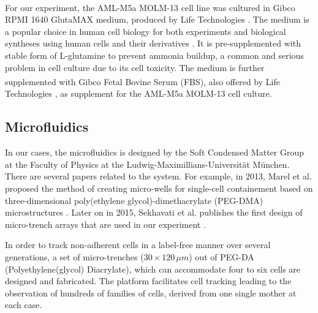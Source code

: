 \documentclass[pdftex,12pt,a4paper]{report}
\begin{document}
For our experiment, the AML-M5a MOLM-13 cell line was cultured in Gibco\textsuperscript{\textregistered} RPMI 1640 GlutaMAX medium, produced by Life Technologies \cite{gibcocellculture2017}. The medium is a popular choice in human cell biology for both experiments and biological syntheses using human cells and their derivatives \cite{blight2000efficient, shimizu2002fabrication}. It is pre-supplemented with stable form of L-glutamine to prevent ammonia buildup, a common and serious problem in cell culture due to its cell toxicity\cite{satter1974effect}. The medium is further supplemented with Gibco\textsuperscript{\textregistered} Fetal Bovine Serum (FBS), also offered by Life Technologies \cite{gibcofbs2017}, as supplement for the AML-M5a MOLM-13 cell culture.


\subsection{Microfluidics}
\label{subsection:microfluid_env}

In our cases, the microfluidics is designed by the Soft Condensed Matter Group at the  Faculty of Physics at the Ludwig-Maximillians-Universit\"at M\"unchen. There are several papers related to the system. For example, in 2013, Marel et al. proposed the method of creating micro-wells for single-cell containement based on three-dimensional poly(ethylene glycol)-dimethacrylate (PEG-DMA) microstructures \cite{marel2013arraying}. Later on in 2015, Sekhavati et al. publishes the first design of micro-trench arrays that are used in our experiment \cite{sekhavati2015marker, sekhavati2015dynamic}.

In order to track non-adherent cells in a label-free manner over several generations, a set of micro-trenches ($30 \times 120 \, \mu m$) out of PEG-DA (Polyethylene(glycol) Diacrylate), which can accommodate four to six cells are designed and fabricated. The platform facilitates cell tracking leading to the observation of hundreds of families of cells, derived from one single mother at each case.
\end{document}
